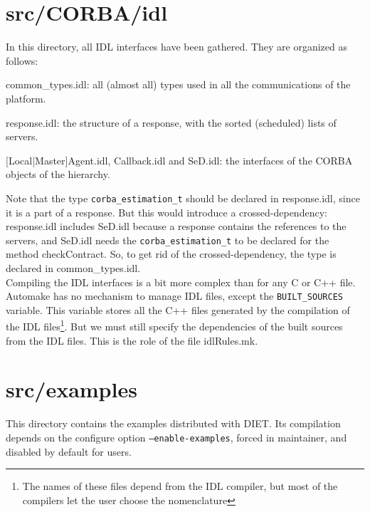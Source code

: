 


\section{\textsf{src/CORBA/idl}}
\label{s:IDL}

In this directory, all IDL interfaces have been gathered. They are organized as
follows:
\begin{description}
\item{\sf common\_types.idl}: all (almost all) types used in all the
  communications of the platform.
\item{\sf response.idl}: the structure of a response, with the sorted
  (scheduled) lists of servers.
\item{$[$\textsf{Local|Master}$]$\textsf{Agent.idl}, \textsf{Callback.idl} and
    \textsf{SeD.idl}}: the interfaces of the CORBA objects of the hierarchy.
\end{description}
Note that the type \texttt{corba\_estimation\_t} should be declared in
\textsf{response.idl}, since it is a part of a response. But this would
introduce a crossed-dependency: \textsf{response.idl} includes \textsf{SeD.idl}
because a response contains the references to the servers, and \textsf{SeD.idl}
needs the \texttt{corba\_estimation\_t} to be declared for the method
\textsf{checkContract}. So, to get rid of the crossed-dependency, the type is
declared in \textsf{common\_types.idl}.
\\

Compiling the IDL interfaces is a bit more complex than for any C or C++ file.
Automake has no mechanism to manage IDL files, except the
\texttt{BUILT\_SOURCES} variable. This variable stores all the C++ files
generated by the compilation of the IDL files\footnote{The names of these files
  depend from the IDL compiler, but most of the compilers let the user choose
  the nomenclature}. But we must still specify the dependencies of the built
sources from the IDL files. This is the role of the file \textsf{idlRules.mk}.



\section{\textsf{src/examples}}
\label{s:examples}

This directory contains the examples distributed with DIET. Its compilation
depends on the configure option \texttt{--enable-examples}, forced in
maintainer, and disabled by default for users.

